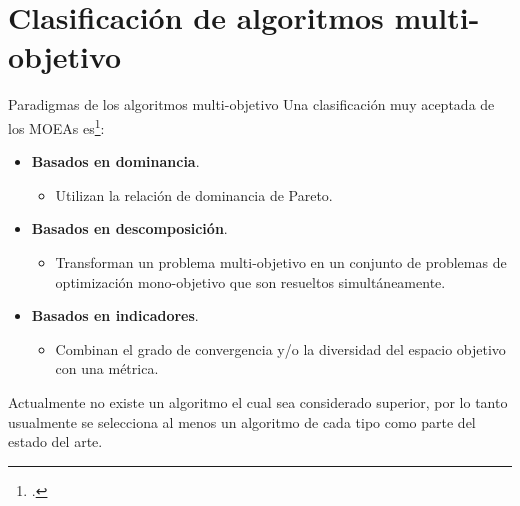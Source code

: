 \documentclass{beamer}
\begin{document}
\section{Clasificación de algoritmos multi-objetivo}

\begin{frame}{Paradigmas de los algoritmos multi-objetivo}
Una clasificación muy aceptada de los MOEAs es\footcite{trivedi2016survey}:
\begin{itemize}
\justifying
\item \textbf{Basados en dominancia}.
   \begin{itemize}
       \item Utilizan la relación de dominancia de Pareto.
   \end{itemize}
\justifying
\item \textbf{Basados en descomposición}.
\begin{itemize}
       \item Transforman un problema multi-objetivo en un conjunto de problemas de optimización mono-objetivo que son resueltos simultáneamente.
   \end{itemize}
\justifying
\item \textbf{Basados en indicadores}.
    \begin{itemize}
        \item Combinan el grado de convergencia y/o la diversidad del espacio objetivo con una métrica.
    \end{itemize}
\end{itemize}

\justifying
\scriptsize
Actualmente no existe un algoritmo el cual sea considerado superior, por lo tanto usualmente se selecciona al menos un algoritmo de cada tipo como parte del estado del arte.
\end{frame}
\end{document}
